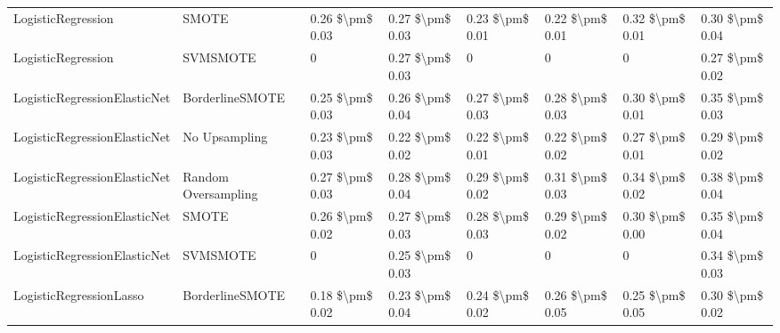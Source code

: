 \begin{tabular}{llllllll}
             LogisticRegression &                         SMOTE & 0.26 \$\textbackslash pm\$ 0.03 &           0.27 \$\textbackslash pm\$ 0.03 &       0.23 \$\textbackslash pm\$ 0.01 &        0.22 \$\textbackslash pm\$ 0.01 &                         0.32 \$\textbackslash pm\$ 0.01 &     0.30 \$\textbackslash pm\$ 0.04 \\
             LogisticRegression &                      SVMSMOTE &               0 &           0.27 \$\textbackslash pm\$ 0.03 &                     0 &                      0 &                                       0 &     0.27 \$\textbackslash pm\$ 0.02 \\
   LogisticRegressionElasticNet &               BorderlineSMOTE & 0.25 \$\textbackslash pm\$ 0.03 &           0.26 \$\textbackslash pm\$ 0.04 &       0.27 \$\textbackslash pm\$ 0.03 &        0.28 \$\textbackslash pm\$ 0.03 &                         0.30 \$\textbackslash pm\$ 0.01 &     0.35 \$\textbackslash pm\$ 0.03 \\
   LogisticRegressionElasticNet &                 No Upsampling & 0.23 \$\textbackslash pm\$ 0.03 &           0.22 \$\textbackslash pm\$ 0.02 &       0.22 \$\textbackslash pm\$ 0.01 &        0.22 \$\textbackslash pm\$ 0.02 &                         0.27 \$\textbackslash pm\$ 0.01 &     0.29 \$\textbackslash pm\$ 0.02 \\
   LogisticRegressionElasticNet &           Random Oversampling & 0.27 \$\textbackslash pm\$ 0.03 &           0.28 \$\textbackslash pm\$ 0.04 &       0.29 \$\textbackslash pm\$ 0.02 &        0.31 \$\textbackslash pm\$ 0.03 &                         0.34 \$\textbackslash pm\$ 0.02 &     0.38 \$\textbackslash pm\$ 0.04 \\
   LogisticRegressionElasticNet &                         SMOTE & 0.26 \$\textbackslash pm\$ 0.02 &           0.27 \$\textbackslash pm\$ 0.03 &       0.28 \$\textbackslash pm\$ 0.03 &        0.29 \$\textbackslash pm\$ 0.02 &                         0.30 \$\textbackslash pm\$ 0.00 &     0.35 \$\textbackslash pm\$ 0.04 \\
   LogisticRegressionElasticNet &                      SVMSMOTE &               0 &           0.25 \$\textbackslash pm\$ 0.03 &                     0 &                      0 &                                       0 &     0.34 \$\textbackslash pm\$ 0.03 \\
        LogisticRegressionLasso &               BorderlineSMOTE & 0.18 \$\textbackslash pm\$ 0.02 &           0.23 \$\textbackslash pm\$ 0.04 &       0.24 \$\textbackslash pm\$ 0.02 &        0.26 \$\textbackslash pm\$ 0.05 &                         0.25 \$\textbackslash pm\$ 0.05 &     0.30 \$\textbackslash pm\$ 0.02 \\

\end{tabular}
